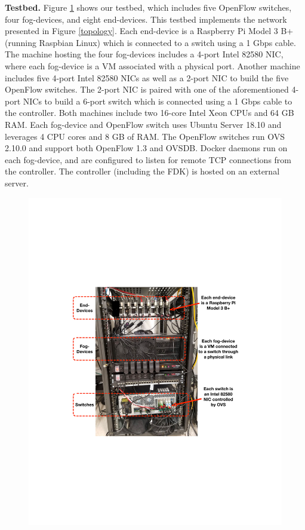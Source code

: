 \textbf{Testbed.} Figure \ref{physicalInfra} shows our testbed, which includes five OpenFlow switches, four fog-devices, and eight end-devices.
This testbed implements the network presented in Figure \ref{topology}.
Each end-device is a Raspberry Pi Model 3 B+ (running Raspbian Linux) which is connected to a switch using a 1 Gbps cable.
The machine hosting the four fog-devices includes a 4-port Intel 82580 NIC, where each fog-device is a VM associated with a physical port.
Another machine includes five 4-port Intel 82580 NICs as well as a 2-port NIC to build the five OpenFlow switches.
The 2-port NIC is paired with one of the aforementioned 4-port NICs to build a 6-port switch which is connected using a 1 Gbps cable to the controller.
Both machines include two 16-core Intel Xeon CPUs and 64 GB RAM.
Each fog-device and OpenFlow switch uses Ubuntu Server 18.10 and leverages 4 CPU cores and 8 GB of RAM.
The OpenFlow switches run OVS 2.10.0 and support both OpenFlow 1.3 and OVSDB.
Docker daemons run on each fog-device, and are configured to listen for remote TCP connections from the controller.
The controller (including the FDK) is hosted on an external server.
%
%
\begin{figure}[t]
\centering
\includegraphics[width=0.75\linewidth]{testbed.pdf}
  \label{physicalInfra}
\end{figure}



